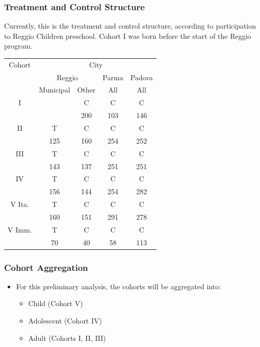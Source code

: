 \documentclass{beamer}
\begin{document}
\begin{frame}
	\frametitle{Treatment and Control Structure}
\footnotesize Currently, this is the treatment and control structure, according to participation to Reggio Children preschool. Cohort I was born before the start of the Reggio program.

	\vspace{0.2cm}
	\centering
	\footnotesize
	\begin{tabular}{ccccc}
	\toprule
	Cohort & \multicolumn{4}{c}{City} \\
	 & \multicolumn{2}{c}{Reggio} & Parma & Padova \\
	 & Municipal & Other & All & All \\
	\midrule
	I &  & C & C & C \\
	& & 200 & 103 & 146 \\
	II & T & C & C & C \\
	& 125 & 160 & 254 & 252 \\
	III & T & C & C & C \\
	& 143 & 137 & 251 & 251 \\
	IV & T & C & C & C \\
	& 156 & 144 & 254 & 282 \\
	V Ita. & T & C & C & C \\
	& 160 & 151 & 291 & 278 \\
	V Imm. & T & C & C & C \\
	&  70 &  40 &  58 & 113 \\
	\bottomrule
	\end{tabular}

\hyperlink{tab:RespRate}{}
\end{frame}


\begin{frame}
	\frametitle{Cohort Aggregation}
	\begin{itemize}
		\item For this preliminary analysis, the cohorts will be aggregated into:
		\begin{itemize}
			\item Child (Cohort V)
			\item Adolescent (Cohort IV)
			\item Adult (Cohorts I, II, III)
		\end{itemize}
	\end{itemize}
\end{frame}

\end{document}

